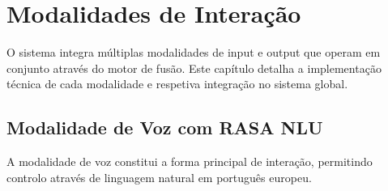 \documentclass{report}
\begin{document}

\chapter{Modalidades de Interação}

O sistema integra múltiplas modalidades de input e output que operam em conjunto através do motor de fusão. Este capítulo detalha a implementação técnica de cada modalidade e respetiva integração no sistema global.

\section{Modalidade de Voz com RASA NLU}

A modalidade de voz constitui a forma principal de interação, permitindo controlo através de linguagem natural em português europeu.

\end{document}
